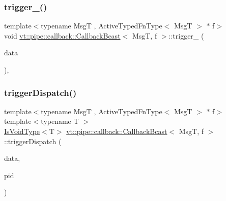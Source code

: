 \mbox{\label{structvt_1_1pipe_1_1callback_1_1_callback_bcast_acc7d0eda09ac15644f876fdab691e269}} 
\subsubsection{\texorpdfstring{trigger\+\_\+()}{trigger\_()}\hspace{0.1cm}{\footnotesize\ttfamily [3/3]}}
{\footnotesize\ttfamily template$<$typename MsgT , Active\+Typed\+Fn\+Type$<$ Msg\+T $>$ $\ast$ f$>$ \\
void \hyperlink{structvt_1_1pipe_1_1callback_1_1_callback_bcast}{vt\+::pipe\+::callback\+::\+Callback\+Bcast}$<$ MsgT, f $>$\+::trigger\+\_\+ (\begin{DoxyParamCaption}\item[{\hyperlink{structvt_1_1pipe_1_1callback_1_1_callback_bcast_aaf994b71056001334d30d74fa9c958f9}{Signal\+Data\+Type} $\ast$}]{data }\end{DoxyParamCaption})\hspace{0.3cm}{\ttfamily [override]}, {\ttfamily [private]}}

\mbox{\label{structvt_1_1pipe_1_1callback_1_1_callback_bcast_a8db0ff95fe319e739a93e87661365a5a}} 
\subsubsection{\texorpdfstring{trigger\+Dispatch()}{triggerDispatch()}\hspace{0.1cm}{\footnotesize\ttfamily [1/4]}}
{\footnotesize\ttfamily template$<$typename MsgT , Active\+Typed\+Fn\+Type$<$ Msg\+T $>$ $\ast$ f$>$ \\
template$<$typename T $>$ \\
\hyperlink{structvt_1_1pipe_1_1callback_1_1_callback_bcast_a3ca08c23824cfac76b837311a1d2c929}{Is\+Void\+Type}$<$T$>$ \hyperlink{structvt_1_1pipe_1_1callback_1_1_callback_bcast}{vt\+::pipe\+::callback\+::\+Callback\+Bcast}$<$ MsgT, f $>$\+::trigger\+Dispatch (\begin{DoxyParamCaption}\item[{\hyperlink{structvt_1_1pipe_1_1callback_1_1_callback_bcast_aaf994b71056001334d30d74fa9c958f9}{Signal\+Data\+Type} $\ast$}]{data,  }\item[{\hyperlink{namespacevt_ac9852acda74d1896f48f406cd72c7bd3}{Pipe\+Type} const \&}]{pid }\end{DoxyParamCaption})\hspace{0.3cm}{\ttfamily [private]}}


